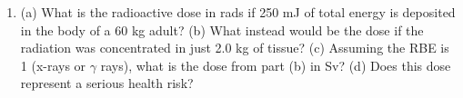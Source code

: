 \documentclass[12pt,twocolumn]{article}
\begin{document}
\begin{enumerate}
\item (a) What is the radioactive dose in rads if 250 mJ of total energy is deposited in the body of a 60 kg adult? (b) What instead would be the dose if the radiation was concentrated in just 2.0 kg of tissue? (c) Assuming the RBE is 1 (x-rays or $\gamma$ rays), what is the dose from part (b) in Sv? (d) Does this dose represent a serious health risk? \\ \vspace{2cm}
\end{enumerate}
\end{document}
